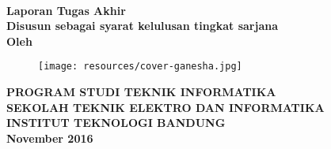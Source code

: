 \clearpage
\pagestyle{empty}


\begin{center}
    
    \smallskip

    \large{\bfseries \MakeUppercase{\thetitle}}
    \\[2\baselineskip]

    \large{\bfseries Laporan Tugas Akhir}
    \\[\baselineskip]

    \normalsize{ \bfseries
    	Disusun sebagai syarat kelulusan tingkat sarjana
	}
    \\[3\baselineskip]

    \normalsize{ \bfseries Oleh\\}
    \large{ \bfseries \MakeUppercase{\theauthor}}

    \vfill
    \begin{figure}[h]
        \centering
      	\texttt{[image: resources/cover-ganesha.jpg]}
    \end{figure}
    \vfill

    \large{ \bfseries
	    \uppercase{
	        Program Studi Teknik Informatika \\
	        Sekolah Teknik Elektro dan Informatika \\
	        Institut Teknologi Bandung\\
	    }
    	November 2016
	}

\end{center}
\restoregeometry
\clearpage
